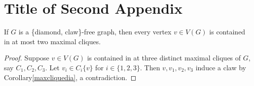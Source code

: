\documentclass[12pt,a4paper,titlepage,openany]{report}
\begin{document}
\chapter{Title of Second Appendix}
\thispagestyle{empty}

\begin{corollary}
If $G$ is a \{diamond, claw\}-free graph, then every vertex $v\in V(G)$ is contained in at most two maximal cliques.
\end{corollary}

\begin{proof}
Suppose $v\in V(G)$ is contained in at three distinct maximal cliques of $G$, say $C_1,C_2,C_3$. Let $v_i\in C_i\{v\}$ for $i\in \{1,2,3\}$. Then $v,v_1,v_2,v_3$ induce a claw by Corollary\ref{maxcliquedia}, a contradiction.
\end{proof}


\end{document}

